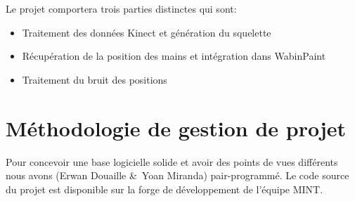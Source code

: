 Le projet comportera trois parties distinctes qui sont:
\begin{itemize}
\item Traitement des données Kinect et génération du squelette
\item Récupération de la position des mains et intégration dans WabinPaint
\item Traitement du bruit des positions 
\end{itemize}


\section{Méthodologie de gestion de projet}
Pour concevoir une base logicielle solide et avoir des points de vues différents nous avons (Erwan Douaille \&\ Yoan Miranda) pair-programmé. Le code source du projet est disponible sur la forge de développement de l'équipe MINT.